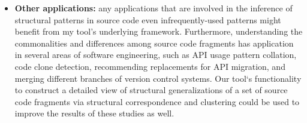 \begin{itemize} [leftmargin=.5in]
\item \textbf{Other applications:} any applications that are involved in the inference of structural patterns in source code even infrequently-used patterns might benefit from my tool’s underlying framework.
Furthermore, understanding the commonalities and differences among source code fragments has application in several areas of software engineering, such as API usage pattern collation, code clone detection, recommending replacements for API migration, and merging different branches of version control systems. Our tool`s functionality to construct a detailed view of structural generalizations of a set of source code fragments via structural correspondence and clustering could be used to improve the results of these studies as well.

\end{itemize}

